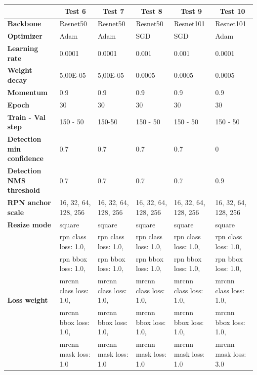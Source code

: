 	
	\begin{longtable}[c]{|p{}|p{}|p{}|p{}|p{}|p{}|}
		\hline
		& \multicolumn{1}{c|}{\textbf{Test 6}} & \multicolumn{1}{c|}{\textbf{Test 7}} & \multicolumn{1}{c|}{\textbf{Test 8}} & \multicolumn{1}{c|}{\textbf{Test 9}} & \multicolumn{1}{c|}{\textbf{Test 10}} \\ \hline
		\endhead
		\textbf{Backbone} & Resnet50 & Resnet50 & Resnet50 & Resnet101 & Resnet101 \\ \hline
		\textbf{Optimizer} & Adam & Adam & SGD & SGD & Adam \\ \hline
		\textbf{Learning rate} & 0.0001 & 0.0001 & 0.001 & 0.001 & 0.0001 \\ \hline
		\textbf{Weight decay} & 5,00E-05 & 5,00E-05 & 0.0005 & 0.0005 & 0.0005 \\ \hline
		\textbf{Momentum} & 0.9 & 0.9 & 0.9 & 0.9 & 0.9 \\ \hline
		\textbf{Epoch} & 30 & 30 & 30 & 30 & 30 \\ \hline
		\textbf{Train - Val step} & 150 - 50 & 150-50 & 150 - 50 & 150 - 50 & 150 - 50 \\ \hline
		\textbf{Detection min confidence} & 0.7 & 0.7 & 0.7 & 0.7 & 0 \\ \hline
		\textbf{Detection NMS threshold} & 0.7 & 0.7 & 0.7 & 0.7 & 0.9 \\ \hline
		\textbf{RPN anchor scale} & 16, 32, 64, 128, 256 & 16, 32, 64, 128, 256 & 16, 32, 64, 128, 256 & 16, 32, 64, 128, 256 & 16, 32, 64, 128, 256 \\ \hline
		\textbf{Resize mode} & square & square & square & square & square \\ \hline
		
		\multirow{6}{*}{\textbf{Loss weight}} & rpn class loss: 1.0, & rpn class loss: 1.0, & rpn class loss: 1.0, & rpn class loss: 1.0, & rpn class loss: 1.0, \\ \cline{2-6} 
		& rpn bbox loss: 1.0, & rpn bbox loss: 1.0, & rpn bbox loss: 1.0, & rpn bbox loss: 1.0, & rpn bbox loss: 1.0, \\ \cline{2-6} 
		& mrcnn class loss: 1.0, & mrcnn class loss: 1.0, & mrcnn class loss: 1.0, & mrcnn class loss: 1.0, & mrcnn class loss: 1.0, \\ \cline{2-6} 
		& mrcnn bbox loss: 1.0, & mrcnn bbox loss: 1.0, & mrcnn bbox loss: 1.0, & mrcnn bbox loss: 1.0, & mrcnn bbox loss: 1.0, \\ \cline{2-6} 
		& mrcnn mask loss: 1.0 & mrcnn mask loss: 1.0 & mrcnn mask loss: 1.0 & mrcnn mask loss: 1.0 & mrcnn mask loss: 3.0 \\  \hline
		

\end{longtable}
